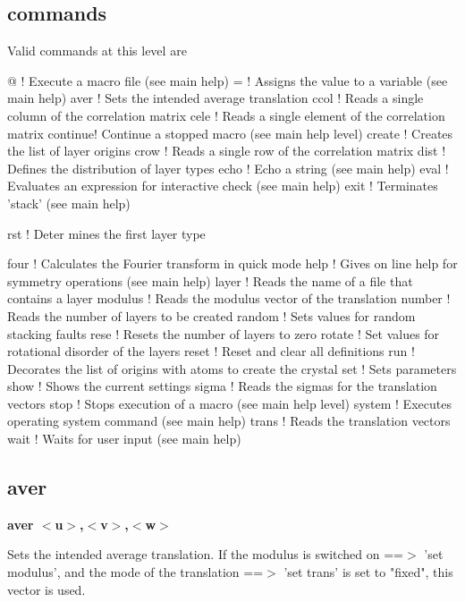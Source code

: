 \subsection*{commands}
Valid commands at this level are 
\par
\begin{MacVerbatim}
@       ! Execute a macro file (see main help)
=       ! Assigns the value to a variable (see main help)
aver    ! Sets the intended average translation
ccol    ! Reads a single column of the correlation matrix
cele    ! Reads a single element of the correlation matrix
continue! Continue a stopped macro (see main help level)
create  ! Creates the list of layer origins
crow    ! Reads a single row of the correlation matrix
dist    ! Defines the distribution of layer types
echo    ! Echo a string (see main help)
eval    ! Evaluates an expression for interactive check (see main help)
exit    ! Terminates 'stack' (see main help)
\end{MacVerbatim}
rst     ! Deter mines the first layer type 
\begin{MacVerbatim}
four    ! Calculates the Fourier transform in quick mode
help    ! Gives on line help for symmetry operations (see main help)
layer   ! Reads the name of a file that contains a layer
modulus ! Reads the modulus vector of the translation
number  ! Reads the number of layers to be created
random  ! Sets values for random stacking faults
rese    ! Resets the number of layers to zero
rotate  ! Set values for rotational disorder of the layers
reset   ! Reset and clear all definitions
run     ! Decorates the list of origins with atoms to create the crystal
set     ! Sets parameters
show    ! Shows the current settings
sigma   ! Reads the sigmas for the translation vectors
stop    ! Stops execution of a macro (see main help level)
system  ! Executes operating system command (see main help)
trans   ! Reads the translation vectors
wait    ! Waits for user input (see main help)
\end{MacVerbatim}
\subsection*{aver}
{\bf aver $ <$u$> $,$ <$v$> $,$ <$w$> $ \par }
\par
\vspace{3pt}
Sets the intended average translation. 
If the modulus is switched on ==$> $ 'set modulus', and the mode of the 
translation ==$> $ 'set trans' is set to "fixed", this vector is used. 

